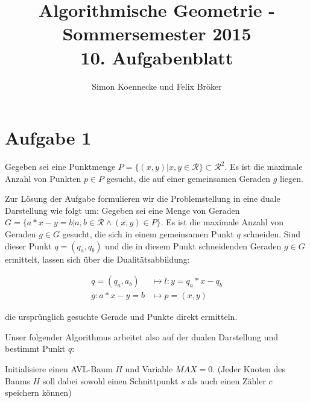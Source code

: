 \documentclass[a4paper]{article}
\begin{document}
\title{Algorithmische Geometrie - Sommersemester 2015\\
       10. Aufgabenblatt }
\author{Simon Koennecke und Felix Bröker}
\date{}
\maketitle

\section*{Aufgabe 1}
Gegeben sei eine Punktmenge $P = \{ (x,y) | x,y \in \mathcal{R} \} \subset \mathcal{R}^2$.
Es ist die maximale Anzahl von Punkten $p \in P$ gesucht, die auf einer gemeinsamen Geraden $g$ liegen.

Zur Lösung der Aufgabe formulieren wir die Problemstellung in eine duale Darstellung wie folgt um:
Gegeben sei eine Menge von Geraden $G = \{a*x -y = b | a,b \in \mathcal{R} \wedge (x,y) \in P \}$.
Es ist die maximale Anzahl von Geraden $g \in G$ gesucht, die sich in einem gemeinsamen Punkt $q$ schneiden.
Sind dieser Punkt $q = (q_a, q_b)$ und die in diesem Punkt schneidenden Geraden $g \in G$ ermittelt, lassen sich über
die Dualitätsabbildung:

\begin{align}
q = (q_a, a_b) &\longmapsto l: y = q_a * x - q_b\\
g:  a*x -y = b &\longmapsto p = (x,y)
\end{align}

die ursprünglich gesuchte Gerade und Punkte direkt ermitteln. 

Unser folgender Algorithmus arbeitet also auf der dualen Darstellung und bestimmt Punkt $q$:
\vspace*{1cm}

 Initialisiere einen AVL-Baum $H$ und Variable $MAX = 0$.
 (Jeder Knoten des Baums $H$ soll dabei sowohl einen Schnittpunkt $s$ 
 als auch einen Zähler $c$ speichern können)
 
\end{document}
